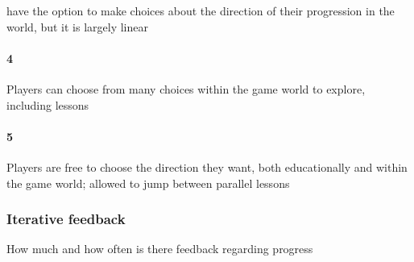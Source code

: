 have the option to make choices about the direction of their progression in the world, but it is largely linear\paragraph{4}Players can choose from many choices within the game world to explore, including lessons\paragraph{5}Players are free to choose the direction they want, both educationally and within the game world; allowed to jump between parallel lessons\subsubsection{Iterative feedback}How much and how often is there feedback regarding progress